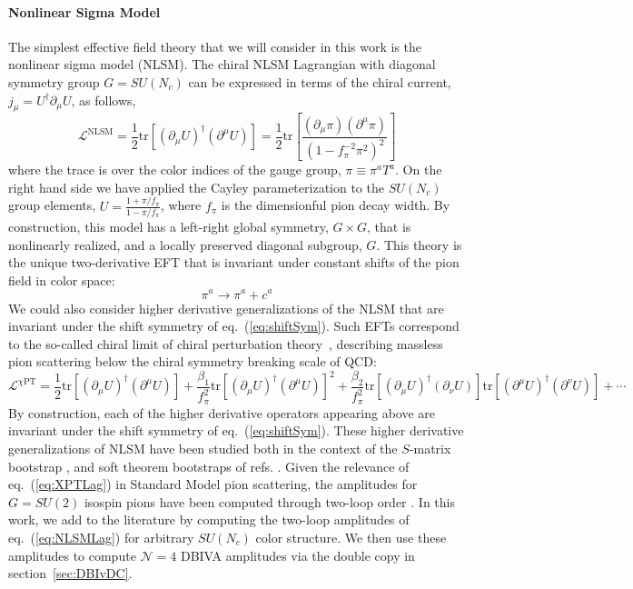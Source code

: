 \documentclass[11pt,letter]{article}
\def\sect#1{section~\ref{#1}}
\def\eqn#1{eq.~(\ref{#1})}
\begin{document}
\paragraph{Nonlinear Sigma Model}
The simplest effective field theory that we will consider in this work is the {nonlinear sigma model} (NLSM). The chiral NLSM Lagrangian with diagonal symmetry group $G=SU(N_c)$ can be expressed in terms of the chiral current, $j_\mu = U^\dagger \partial_\mu U$, as follows,
\begin{equation}\label{eq:NLSMLag}
\mathcal{L}^{\text{NLSM}}= \frac{1}{2}\text{tr}[(\partial_\mu U)^\dagger (\partial ^\mu U)] = \frac{1}{2}\text{tr}\left[\frac{(\partial_\mu\pi )( \partial^\mu \pi) }{(1-f_\pi^{-2}\pi^2)^2}\right]
\end{equation}
where the trace is over the color indices of the gauge group, $\pi \equiv \pi^a T^a$. On the right hand side we have applied the Cayley parameterization to the $SU(N_c)$ group elements, $U= \frac{1+\pi/f_\pi}{1-\pi/f_\pi}$, where $f_\pi$ is the dimensionful pion decay width. By construction, this model has a left-right global symmetry, $G\times G$, that is nonlinearly realized, and a locally preserved diagonal subgroup, $G$. This theory is the unique two-derivative EFT that is invariant under constant shifts of the pion field in color space:
\begin{equation}\label{eq:shiftSym}
\pi^a \rightarrow \pi^a + c^a
\end{equation}
We could also consider higher derivative generalizations of the NLSM that are invariant under the shift symmetry of \eqn{eq:shiftSym}.  Such  EFTs correspond to the so-called chiral limit of {chiral perturbation theory}~\cite{Weinberg:1978kz,Gasser:1983yg,Kampf:2006yf,Kampf:2013vha}, describing massless pion scattering below the chiral symmetry breaking scale of QCD:
\begin{equation}\label{eq:XPTLag}
\mathcal{L}^{\chi\text{PT}}=\frac{1}{2}\text{tr}[(\partial_\mu U)^\dagger (\partial ^\mu U)] + \frac{\beta_1}{f_\pi^2} \text{tr}[(\partial_\mu U)^\dagger (\partial ^\mu U)]^2 + \frac{\beta_2}{f_\pi^2} \text{tr}[(\partial_\mu U)^\dagger( \partial_\nu U)]\text{tr}[(\partial^\mu U)^\dagger( \partial^\nu U)] +\cdots
\end{equation}
By construction, each of the higher derivative operators appearing above are invariant under the shift symmetry of \eqn{eq:shiftSym}. These higher derivative generalizations of NLSM have been studied both in the context of the $S$-matrix bootstrap \cite{Manohar:2008tc,Bellazzini:2016xrt,Guerrieri:2020bto}, and soft theorem bootstraps of refs. \cite{Cheung:2014dqa,Cheung:2015ota,Cheung:2016drk,Cheung:2018oki,Low:2019ynd}. Given the relevance of \eqn{eq:XPTLag} in Standard Model pion scattering, the amplitudes for $G= SU(2)$ isospin pions have been computed through two-loop order \cite{Bijnens:1995yn,Bijnens:1997vq,Girlanda:1997ed}. In this work, we add to the literature by computing the two-loop amplitudes of \eqn{eq:NLSMLag} for arbitrary $SU(N_c)$ color structure. We then use these amplitudes to compute $\mathcal{N}=4$ DBIVA amplitudes via the double copy in \sect{sec:DBIvDC}.
\end{document}
